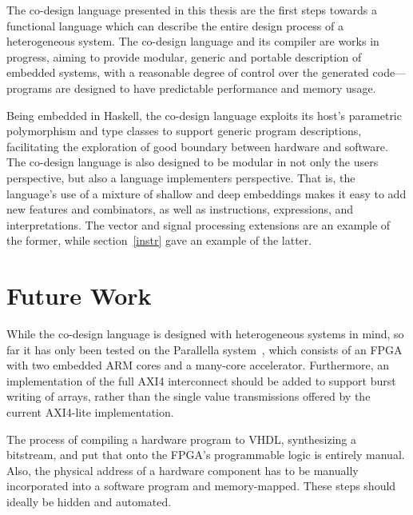\documentclass[../paper.tex]{subfiles}
\begin{document}

The co-design language presented in this thesis are the first steps towards a functional language which can describe the entire design process of a heterogeneous system. The co-design language and its compiler are works in progress, aiming to provide modular, generic and portable description of embedded systems, with a reasonable degree of control over the generated code---programs are designed to have predictable performance and memory usage.

Being embedded in Haskell, the co-design language exploits its host's parametric polymorphism and type classes to support generic program descriptions, facilitating the exploration of good boundary between hardware and software. The co-design language is also designed to be modular in not only the users perspective, but also a language implementers perspective. That is, the language's use of a mixture of shallow and deep embeddings makes it easy to add new features and combinators, as well as instructions, expressions, and interpretations. The vector and signal processing extensions are an example of the former, while section~\ref{instr} gave an example of the latter.

\section{Future Work}
\label{future}

While the co-design language is designed with heterogeneous systems in mind, so far it has only been tested on the Parallella system~\cite{olofsson2014}, which consists of an FPGA with two embedded ARM cores and a many-core accelerator. Furthermore, an implementation of the full AXI4 interconnect should be added to support burst writing of arrays, rather than the single value transmissions offered by the current AXI4-lite implementation.

The process of compiling a hardware program to VHDL, synthesizing a bitstream, and put that onto the FPGA's programmable logic is entirely manual. Also, the physical address of a hardware component has to be manually incorporated into a software program and memory-mapped. These steps should ideally be hidden and automated.
\end{document}
